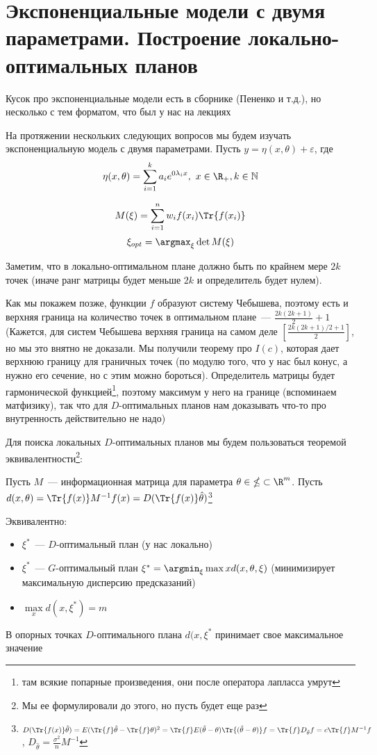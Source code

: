 \section{Экспоненциальные модели с двумя параметрами. Построение локально-оптимальных планов}

{\color{blue} Кусок про экспоненциальные модели есть в сборнике (Пененко и т.д.), но несколько  с тем форматом, что был у нас на лекциях}

На протяжении нескольких следующих вопросов мы будем изучать экспоненциальную модель с двумя параметрами.
Пусть $y = \eta(x, \theta) + \varepsilon$, где 
$$\eta(x,\theta) = \sum\limits_{i=1}^{k} a_i e^{0\lambda_ix}, x \in \R_{+}, k \in \mathbb{N}$$

$$M(\xi) = \sum \limits_{i=1}^{n} w_if(x_i)\Tr{f(x_i)}$$
$$\xi_{opt} = \argmax_{\xi} \det M(\xi)$$

Заметим, что в локально-оптимальном плане должно быть по крайнем мере $2k$ точек (иначе ранг матрицы будет меньше $2k$ и определитель будет нулем). 

Как мы покажем позже, функции $f$ образуют систему Чебышева, поэтому есть и верхняя граница на количество точек в оптимальном плане — $\frac{2k(2k+1)}{2}+1$ (Кажется, для систем Чебышева верхняя граница на самом деле $[\frac{2k(2k+1)/2 + 1}{2}]$, но мы это внятно не доказали. Мы получили теорему про $I(c)$, которая дает верхнюю границу для граничных точек (по модулю того, что у нас был конус, а нужно его сечение, но с этим можно бороться). Определитель матрицы будет гармонической функцией\footnote{там всякие попарные произведения, они после оператора лапласса умрут}, поэтому максимум у него на границе (вспоминаем матфизику), так что для $D$-оптимальных планов нам доказывать что-то про внутренность действительно не надо)


Для поиска локальных $D$-оптимальных планов мы будем пользоваться теоремой эквивалентности\footnote{Мы ее формулировали до этого, но пусть будет еще раз}:

\begin{thm}
Пусть $M$ — информационная матрица для параметра $\theta \in \mathbb{\Theta} \subset \R^m$.
Пусть $d(x,\theta) = \Tr{f(x)}M^{-1}f(x) = D(\Tr{f(x)}\hat{\theta})$\footnote{$D(\Tr{f(x)}\hat{\theta}) = E(\Tr{f}\hat{\theta} - \Tr{f}\theta)^2 = \Tr{f}E(\hat{\theta} - \theta)\Tr{(\hat{\theta} - \theta)}f = \Tr{f}D_{\hat{\theta}}f = c\Tr{f}M^{-1}f$, $D_{\hat{\theta}} = \frac{\sigma^2}{n} M^{-1}$}


Эквивалентно:
\begin{itemize}
\item $\xi^{*}$ — $D$-оптимальный план (у нас локально)
\item $\xi^{*}$ — $G$-оптимальный план $\xi^{*} = \argmin_{\xi}\max{x}d(x,\theta, \xi)$ (минимизирует максимальную дисперсию предсказаний)
\item $\max\limits_{x} d(x,\xi^{*}) = m$
\end{itemize}
В опорных точках $D$-оптимального плана  $d(x, \xi^{*}$ принимает свое максимальное значение
\end{thm}


